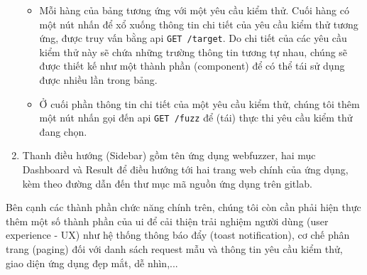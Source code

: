 \begin{enumerate}
\begin{itemize}
        \item Mỗi hàng của bảng tương ứng với một yêu cầu kiểm thử. Cuối hàng có một nút nhấn để xổ xuống thông tin chi tiết của yêu cầu kiểm thử tương ứng, được truy vấn bằng \acrshort{api} \colorbox{gray!30}{\texttt{GET /target}}. Do chi tiết của các yêu cầu kiểm thử này sẽ chứa những trường thông tin tương tự nhau, chúng sẽ được thiết kế như một thành phần (component) để có thể tái sử dụng được nhiều lần trong bảng.
        \item Ở cuối phần thông tin chi tiết của một yêu cầu kiểm thử, chúng tôi thêm một nút nhấn gọi đến \acrshort{api} \colorbox{gray!30}{\texttt{GET /fuzz}} để (tái) thực thi yêu cầu kiểm thử đang chọn.
    \end{itemize}
    \item Thanh điều hướng (Sidebar) gồm tên ứng dụng webfuzzer, hai mục Dashboard và Result để điều hướng tới hai trang web chính của ứng dụng, kèm theo đường dẫn đến thư mục mã nguồn ứng dụng trên gitlab.
\end{enumerate}
Bên cạnh các thành phần chức năng chính trên, chúng tôi còn cần phải hiện thực thêm một số thành phần của \acrshort{ui} để cải thiện trải nghiệm người dùng (user experience - UX) như hệ thống thông báo đẩy (toast notification), cơ chế phân trang (paging) đối với danh sách request mẫu và thông tin yêu cầu kiểm thử, giao diện ứng dụng đẹp mắt, dễ nhìn,...
